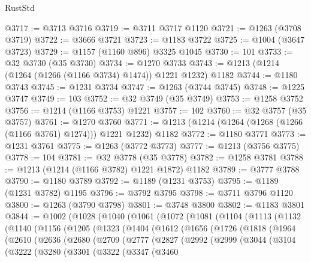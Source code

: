 \begin{lexlean}{RustStd}
\begin{coremodule}
@3717 := @3713 @3716
@3719 := @3711 @3717 @1120
@3721 := @1263 (@3708 @3719)
@3722 := @3666 @3721
@3723 := @1183 @3722
@3725 := @1004 (@3647 @3723)
@3729 := @1157 (@1160 @896) @3325 @1045
@3730 := 101
@3733 := @32 @3730 (@35 @3730)
@3734 := @1270 @3733
@3743 := @1213 (@1214 (@1264 (@1266 (@1166 @3734) @1474)) @1221 @1232) @1182
@3744 := @1180 @3743
@3745 := @1231 @3734
@3747 := @1263 (@3744 @3745)
@3748 := @1225 @3747
@3749 := 103
@3752 := @32 @3749 (@35 @3749)
@3753 := @1258 @3752
@3756 := @1214 (@1166 @3753) @1221
@3757 := 102
@3760 := @32 @3757 (@35 @3757)
@3761 := @1270 @3760
@3771 := @1213 (@1214 (@1264 (@1268 (@1266 (@1166 @3761) @1274))) @1221 @1232) @1182
@3772 := @1180 @3771
@3773 := @1231 @3761
@3775 := @1263 (@3772 @3773)
@3777 := @1213 (@3756 @3775)
@3778 := 104
@3781 := @32 @3778 (@35 @3778)
@3782 := @1258 @3781
@3788 := @1213 (@1214 (@1166 @3782) @1221 @1872) @1182
@3789 := @3777 @3788
@3790 := @1180 @3789
@3792 := @1189 (@1231 @3753)
@3795 := @1189 (@1231 @3782) @1195
@3796 := @3792 @3795
@3798 := @3711 @3796 @1120
@3800 := @1263 (@3790 @3798)
@3801 := @3748 @3800
@3802 := @1183 @3801
@3844 := @1002
    (@1028
      (@1040
        (@1061
          (@1072
            (@1081
              (@1104
                (@1113
                  (@1132
                    (@1140
                      (@1156
                        (@1205
                          (@1323
                            (@1404
                              (@1612
                                (@1656
                                  (@1726
                                    (@1818
                                      (@1964
                                        (@2610
                                          (@2636
                                            (@2680
                                              (@2709
                                                (@2777
                                                  (@2827
                                                    (@2992
                                                      (@2999
                                                        (@3044
                                                          (@3104
                                                            (@3222
                                                              (@3280
                                                                (@3301
                                                                  (@3322
                                                                    (@3347
                                                                      (@3460

\end{coremodule}
\end{lexlean}
